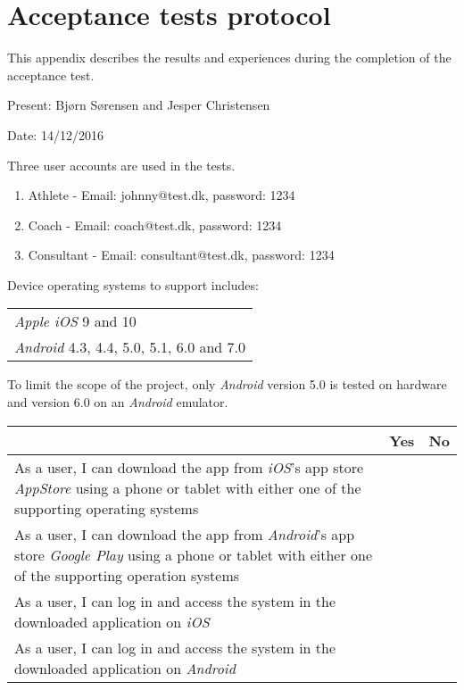 \chapter{Acceptance tests protocol}
\label{ch:protocol}
This appendix describes the results and experiences during the completion of the acceptance test.

Present: Bjørn Sørensen and Jesper Christensen

Date: 14/12/2016

Three user accounts are used in the tests.

\begin{enumerate}
\item Athlete - Email: johnny@test.dk, password: 1234
\item Coach - Email: coach@test.dk, password: 1234
\item Consultant - Email: consultant@test.dk, password: 1234
\end{enumerate}


Device operating systems to support includes: \newline
\begin{tabularx}{\textwidth}{X}
    \textit{Apple iOS} 9 and 10 \\
    \textit{Android} 4.3, 4.4, 5.0, 5.1, 6.0 and 7.0
\end{tabularx}

To limit the scope of the project, only \textit{Android} version 5.0 is tested on hardware and version 6.0 on an \textit{Android} emulator.

\begin{tabularx}{\textwidth}{|b|c|c|}
	\hline
	 & Yes & No \\
	\hline
	As a user, I can download the app from \textit{iOS}'s app store \textit{AppStore} using a phone or tablet with either one of the supporting operating systems &   & \xmark  \\
	\hline
	As a user, I can download the app from \textit{Android}'s app store \textit{Google Play} using a phone or tablet with either one of the supporting operation systems & \xmark  &  \\
	\hline
	As a user, I can log in and access the system in the downloaded application on \textit{iOS} &  & \xmark \\
		\hline
	As a user, I can log in and access the system in the downloaded application on \textit{Android} & \xmark  &  \\
	\hline
\end{tabularx}
	

